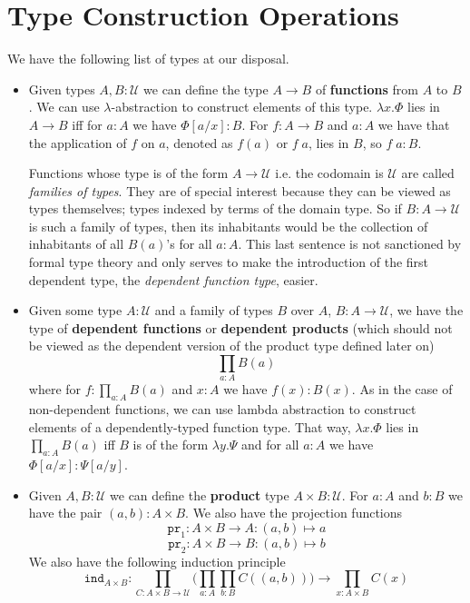 \documentclass[12pt]{report}
\begin{document}
\section{Type Construction Operations}
We have the following list of types at our disposal.
\begin{itemize}
	\item Given types $A, B : \mathcal{U}$ we can define the type $A \rightarrow B$ of \textbf{functions} from $A$ to $B$. 
		We can use $\lambda$-abstraction to construct elements of this type. $\lambda x. \Phi$ lies in $A \rightarrow B$ iff for $a : A$ we have $\Phi[a/x] : B$. 
		For $f : A \rightarrow B$ and $a : A$ we have that the application of $f$ on $a$, denoted as $f(a)$ or $f\;a$, lies in $B$, so $f\;a : B$. 

		Functions whose type is of the form $A \rightarrow \mathcal{U}$ i.e. the codomain is $\mathcal{U}$ are called \textit{families of types}. 
		They are of special interest because they can be viewed as types themselves; types indexed by terms of the domain type. 
		So if $B : A \rightarrow \mathcal{U}$ is such a family of types, then its inhabitants would be the collection of inhabitants of all $B(a)$'s for all $a  : A$. 
		This last sentence is not sanctioned by formal type theory and only serves to make the introduction of the first dependent type, the \textit{dependent function type}, easier.
	\item Given some type $A : \mathcal{U}$ and a family of types $B$ over $A$, $B : A \rightarrow \mathcal{U}$, we have the type of \textbf{dependent functions} or \textbf{dependent products} (which should not be viewed as the dependent version of the product type defined later on) $$\prod_{a : A} B(a)$$
	where for $f : \prod_{a : A} B(a)$ and $x : A$ we have $f(x) : B(x)$. 
	As in the case of non-dependent functions, we can use lambda abstraction to construct elements of a dependently-typed function type. 
	That way, $\lambda x.\Phi$ lies in $\prod_{a:A}B(a)$ iff $B$ is of the form $\lambda y.\Psi$ and for all $a:A$ we have $\Phi[a/x] : \Psi[a/y]$. 
	\item Given $A, B : \mathcal{U}$ we can define the \textbf{product} type $A \times B : \mathcal{U}$. 
	For $a : A$ and $b : B$ we have the pair $(a,b) : A \times B$. 
	We also have the projection functions 
	$$\mathtt{pr}_1 : A \times B \rightarrow A : (a,b) \mapsto a$$
	$$\mathtt{pr}_2 : A \times B \rightarrow B : (a,b) \mapsto b$$
	We also have the following induction principle
	$$\mathtt{ind}_{A\times B} : \prod_{C: A\times B \rightarrow \mathcal{U}}\big( \prod_{a:A}\prod_{b:B} C((a,b)) \big) \rightarrow \prod_{x: A\times B} C(x)$$

\end{itemize}
\end{document}
